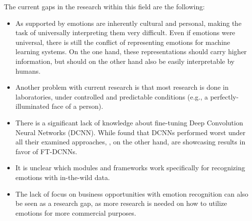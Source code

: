 \newline\newline
The current gaps in the research within this field are the following:\newline
\begin{itemize}
    \item As supported by \citet{Salah:2018:VideoBasedER} emotions are inherently cultural and personal, making the task of universally interpreting them very difficult. Even if emotions were universal, there is still the conflict of representing emotions for machine learning systems. On the one hand, these representations should carry higher information, but should on the other hand also be easily interpretable by humans.
    \item Another problem with current research is that most research is done in laboratories, under controlled and predictable conditions (e.g., a perfectly-illuminated face of a person).
    \item There is a significant lack of knowledge about fine-tuning Deep Convolution Neural Networks (DCNN). While \citet{Kossaifi:2017:AFEW-VADatabase} found that DCNNs performed worst under all their examined approaches, \citet{Handrich:2020:SimultaneousPredVA}, on the other hand, are showcasing results in favor of FT-DCNNs.
    \item It is unclear which modules and frameworks work specifically for recognizing emotions with in-the-wild data.
    \item The lack of focus on business opportunities with emotion recognition can also be seen as a research gap, as more research is needed on how to utilize emotions for more commercial purposes.
\end{itemize}

